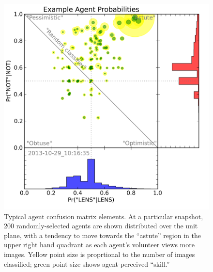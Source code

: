 \documentclass[useAMS,usenatbib,a4paper]{mn2e}
\begin{document}
\begin{figure}
\centering\includegraphics[width=0.9\linewidth]{sw-system-figs/CFHTLS_2013-10-29_10:16:35_probabilities.png}
\caption{Typical \SW agent confusion matrix elements. At a particular
snapshot, 200 randomly-selected agents are shown distributed over the unit plane, with a
tendency to move towards the ``astute'' region in the upper right hand
quadrant as each agent's volunteer views more images. Yellow point size is
proprtional to the number of images classified; green point size shows
agent-perceived ``skill.''}
\label{fig:swap:agent-probabilities}
\end{figure}
\end{document}
